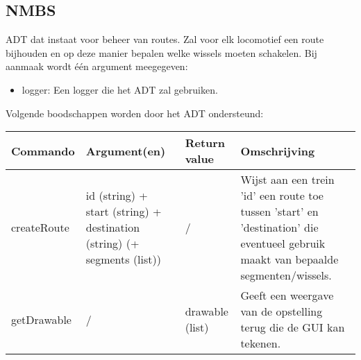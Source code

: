 \documentclass{article}
\begin{document}
\subsection{NMBS}
ADT dat instaat voor beheer van routes. Zal voor elk locomotief een route bijhouden en op deze manier bepalen welke wissels moeten schakelen. Bij aanmaak wordt \'{e}\'{e}n argument meegegeven:
\begin{itemize}
  \item logger: Een logger die het ADT zal gebruiken.
\end{itemize}
Volgende boodschappen worden door het ADT ondersteund:
\begin{center}
    \begin{tabular}{ | l | p{4cm} | l | p{6cm} |}
    \hline
    Commando & Argument(en) & Return value & Omschrijving \\ \hline
    createRoute & id (string) + start (string) + destination (string) (+ segments (list)) & / & Wijst aan een trein 'id' een route toe tussen 'start' en 'destination' die eventueel gebruik maakt van bepaalde segmenten/wissels. \\ \hline
    getDrawable & / & drawable (list) & Geeft een weergave van de opstelling terug die de GUI kan tekenen. \\ \hline
    \end{tabular}
\end{center}
\end{document}
